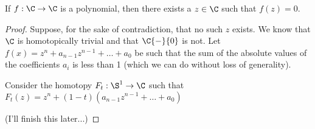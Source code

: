 \begin{theorem}
	If $f:\C\rightarrow\C$ is a polynomial, then there exists a $z\in \C$ such that $f(z)=0$.
	
	\end{theorem}

\begin{proof}
	Suppose, for the sake of contradiction, that no such $z$ exists.  We know that $\C$ is homotopically trivial and that $\C{-}\{0\}$ is not.  Let $f(x) = z^n + a_{n-1}z^{n-1} + \dots + a_0$ be such that the sum of the absolute values of the coefficients $a_i$ is less than 1 (which we can do without loss of generality).
	
	Consider the homotopy $F_t:\S^1\rightarrow\C$ such that $F_t(z)=z^n + (1-t)(a_{n-1}z^{n-1}+\dots + a_0)$
	
	(I'll finish this later...)
\end{proof}